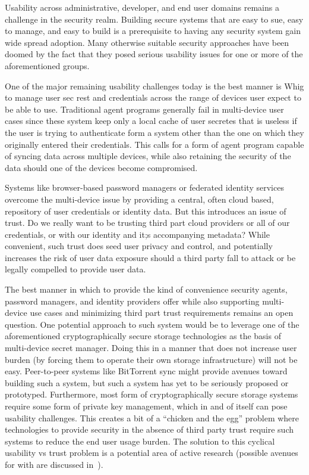 \documentclass{sig-alternate}
\begin{document}
Usability across administrative, developer, and end user domains
remains a challenge in the security realm. Building secure systems
that are easy to sue, easy to manage, and easy to build is a
prerequisite to having any security system gain wide spread
adoption. Many otherwise suitable security approaches have been doomed
by the fact that they posed serious usability issues for one or more
of the aforementioned groups.

One of the major remaining usability challenges today is the best
manner is Whig to manage user sec rest and credentials across the
range of devices user expect to be able to use. Traditional agent
programs generally fail in multi-device user cases since these system
keep only a local cache of user secretes that is useless if the user
is trying to authenticate form a system other than the one on which
they originally entered their credentials. This calls for a form of
agent program capable of syncing data across multiple devices, while
also retaining the security of the data should one of the devices
become compromised.

Systems like browser-based password managers or federated identity
services overcome the multi-device issue by providing a central, often
cloud based, repository of user credentials or identity data. But this
introduces an issue of trust. Do we really want to be trusting third
part cloud providers or all of our credentials, or with our identity
and it;s accompanying metadata? While convenient, such trust does seed
user privacy and control, and potentially increases the risk of user
data exposure should a third party fall to attack or be legally
compelled to provide user data.

The best manner in which to provide the kind of convenience security
agents, password managers, and identity providers offer while also
supporting multi-device use cases and minimizing third part trust
requirements remains an open question. One potential approach to such
system would be to leverage one of the aforementioned
cryptographically secure storage technologies as the basis of
multi-device secret manager. Doing this in a manner that does not
increase user burden (by forcing them to operate their own storage
infrastructure) will not be easy. Peer-to-peer systems like BitTorrent
sync might provide avenues toward building such a system, but such a
system has yet to be seriously proposed or prototyped. Furthermore,
most form of cryptographically secure storage systems require some
form of private key management, which in and of itself can pose
usability challenges. This creates a bit of a ``chicken and the egg''
problem where technologies to provide security in the absence of third
party trust require such systems to reduce the end user usage
burden. The solution to this cyclical usability vs trust problem is a
potential area of active research (possible avenues for with are
discussed in~\cite{custos-masters}).
\end{document}
